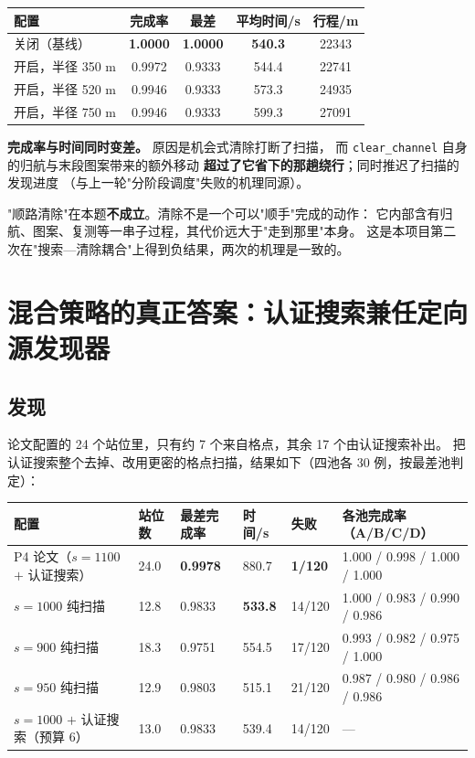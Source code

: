 \begin{center}
\begin{tabular}{lcccc}
\toprule
配置 & 完成率 & 最差 & 平均时间/s & 行程/m \\ \midrule
关闭（基线） & \textbf{1.0000} & \textbf{1.0000} & \textbf{540.3} & 22343 \\
开启，半径 350 m & 0.9972 & 0.9333 & 544.4 & 22741 \\
开启，半径 520 m & 0.9946 & 0.9333 & 573.3 & 24935 \\
开启，半径 750 m & 0.9946 & 0.9333 & 599.3 & 27091 \\
\bottomrule
\end{tabular}
\end{center}

\textbf{完成率与时间同时变差。} 原因是机会式清除打断了扫描，
而 \texttt{clear\_channel} 自身的归航与末段图案带来的额外移动
\textbf{超过了它省下的那趟绕行}；同时推迟了扫描的发现进度
（与上一轮"分阶段调度"失败的机理同源）。

\begin{warnbox}[title=结论]
"顺路清除"在本题\textbf{不成立}。清除不是一个可以"顺手"完成的动作：
它内部含有归航、图案、复测等一串子过程，其代价远大于"走到那里"本身。
这是本项目第二次在"搜索—清除耦合"上得到负结果，两次的机理是一致的。
\end{warnbox}

\section{混合策略的真正答案：认证搜索兼任定向源发现器}

\subsection{发现}

论文配置的 24 个站位里，只有约 7 个来自格点，其余 17 个由认证搜索补出。
把认证搜索整个去掉、改用更密的格点扫描，结果如下（四池各 30 例，按最差池判定）：

\begin{center}
\footnotesize
\begin{tabular}{p{3.6cm}p{1.3cm}p{1.5cm}p{1.5cm}p{1.1cm}p{3.6cm}}
\toprule
配置 & 站位数 & 最差完成率 & 时间/s & 失败 & 各池完成率（A/B/C/D） \\ \midrule
P4 论文（$s{=}1100$ $+$ 认证搜索） & 24.0 & \textbf{0.9978} & 880.7 & \textbf{1/120} & 1.000 / 0.998 / 1.000 / 1.000 \\
$s{=}1000$ 纯扫描 & 12.8 & 0.9833 & \textbf{533.8} & 14/120 & 1.000 / 0.983 / 0.990 / 0.986 \\
$s{=}900$ 纯扫描 & 18.3 & 0.9751 & 554.5 & 17/120 & 0.993 / 0.982 / 0.975 / 1.000 \\
$s{=}950$ 纯扫描 & 12.9 & 0.9803 & 515.1 & 21/120 & 0.987 / 0.980 / 0.986 / 0.986 \\
$s{=}1000$ $+$ 认证搜索（预算 6） & 13.0 & 0.9833 & 539.4 & 14/120 & --- \\
\bottomrule
\end{tabular}
\end{center}

